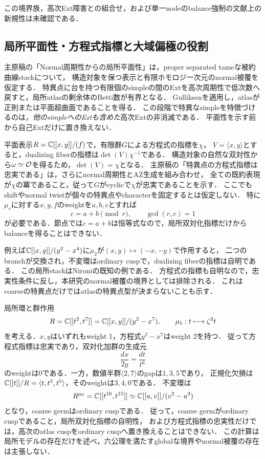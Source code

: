 \documentclass[11pt,a4paper]{ltjsarticle}
\begin{document}
この境界族，高次Ext障害との組合せ，および単一nodeのbalance強制の文献上の新規性は未確認である．

\subsection{局所平面性・方程式指標と大域偏極の役割}\label{subsec:v7-local-global}

主原稿の「Normal周期性からの局所平面性」は，proper separated tameな被約曲線stackについて，
構造対象を保つ表示と有限ホモロジー次元のnormal被覆を仮定する．
特異点に台を持つ有限個のsimpleの間のExtを高次周期性で低次数へ戻すと，局所atlasの剰余体のBetti数が有界となる．
Gulliksen\cite[Proposition 6, p.~300]{Gulliksen1967}を適用し，atlasが正則または平面超曲面であることを得る．
この段階で特異なsimpleを特徴づけるのは，\emph{他のsimpleへのExtも含めた}高次Extの非消滅である．
平面性を示す前から自己Extだけに置き換えない．

平面表示$R=\mathbb C[[x,y]]/(f)$で，有限群$G$による方程式の指標を$\chi$，
$V=\langle x,y\rangle$とすると，dualizing fiberの指標は$\det(V)\chi^{-1}$である．
構造対象の自然な双対性から$\omega\simeq\mathcal O$を得るため，$\det(V)=\chi$となる．
主原稿の「特異点の方程式指標は忠実である」は，さらにnormal周期性とAZ生成を組み合わせ，
全ての既約表現が$\chi$の冪であること，従って$G$がcyclicで$\chi$が忠実であることを示す．
ここでもshiftやnormal twistが個々の特異点やcharacterを固定するとは仮定しない．
特に$\mu_r$に対する$x,y,f$のweightを$a,b,c$とすれば
\[
 c=a+b\pmod r,\qquad \gcd(r,c)=1
\]
が必要である．節点では$c=a+b$は恒等式なので，局所双対化指標だけからbalanceを得ることはできない．

例えば$\mathbb C[[x,y]]/(y^2-x^4)$に$\mu_2$が$(x,y)\mapsto(-x,-y)$で作用すると，
二つのbranchが交換され，不変環はordinary cuspで，dualizing fiberの指標は自明である．
この局所stackはNironi\cite[Example 3.7]{NironiDuality}の既知の例である．
方程式の指標も自明なので，忠実性条件に反し，本研究のnormal被覆の境界としては排除される．
これはcoarseの特異点だけではatlasの特異点型が決まらないことも示す．

\begin{example}[忠実な方程式指標だけでは除けない高次cusp]\label{ex:v7-a6-cusp}
局所環と群作用
\[
 R=\mathbb C[[t^2,t^7]]
   =\mathbb C[[x,y]]/(y^2-x^7),\qquad
 \mu_5:t\longmapsto\zeta^3t
\]
を考える．$x,y$はいずれもweight $1$，方程式$y^2-x^7$はweight $2$を持つ．
従って方程式指標は忠実であり，双対化加群の生成元
\[
 \frac{dx}{2y}=\frac{dt}{t^6}
\]
のweightは$0$である．一方，数値半群$\langle2,7\rangle$のgapは$1,3,5$であり，
正規化欠損は$\mathbb C[[t]]/R=\langle t,t^3,t^5\rangle$，そのweightは$3,4,0$である．
不変環は
\[
 R^{\mu_5}=\mathbb C[[t^{10},t^{15}]]
 \simeq\mathbb C[[u,v]]/(v^2-u^3)
\]
となり，coarse germはordinary cuspである．
従って，coarse germがordinary cuspであること，局所双対化指標の自明性，
および方程式指標の忠実性だけでは，高次のatlas cuspをordinary cuspへ置き換えることはできない．
この計算は局所モデルの存在だけを述べ，六公理を満たすglobalな境界やnormal被覆の存在は主張しない．
\end{example}
\end{document}
